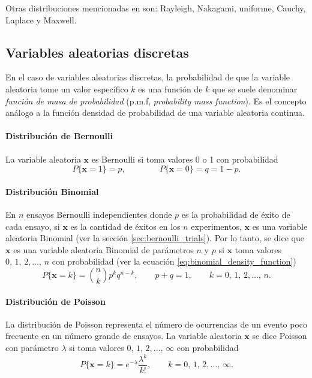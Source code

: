 \documentclass[a4paper]{report}
\newcommand{\x}{\mathbf{x}}
\begin{document}
Otras distribuciones mencionadas en \cite{papoulis2002probability} son: Rayleigh, Nakagami, uniforme, Cauchy, Laplace y Maxwell.

\subsection{Variables aleatorias discretas}\label{sec:discrete_random_variables}

En el caso de variables aleatorias discretas, la probabilidad de que la variable aleatoria tome un valor específico \(k\) es una función de \(k\) que se suele denominar \emph{función de masa de probabilidad} (p.m.f, \emph{probability mass function}). Es el concepto análogo a la función densidad de probabilidad de una variable aleatoria continua.

\paragraph{Distribución de Bernoulli} 

La variable aleatoria \(\x\) es Bernoulli si toma valores 0 o 1 con probabilidad
\[
 P\{\x=1\}=p,\qquad\qquad P\{\x=0\}=q=1-p.
\]

\paragraph{Distribución Binomial}

En \(n\) ensayos Bernoulli independientes donde \(p\) es la probabilidad de éxito de cada ensayo, si \(\x\) es la cantidad de éxitos en los \(n\) experimentos, \(\x\) es una variable aleatoria Binomial (ver la sección \ref{sec:bernoulli_trials}). Por lo tanto, se dice que \(\x\) es una variable aleatoria Binomial de parámetros \(n\) y \(p\) si \(\x\) toma valores \(0,\,1,\,2,\dots,\,n\) con probabilidad (ver la ecuación \ref{eq:binomial_density_function})
\begin{equation}\label{eq:binomial_density_function2}
 P\{\x=k\}=\binom{n}{k}p^{k}q^{n-k},\qquad p+q=1,\qquad k=0,\,1,\,2,\dots,\,n.
\end{equation}

\paragraph{Distribución de Poisson}

La distribución de Poisson representa el número de ocurrencias de un evento poco frecuente en un número grande de ensayos. La variable aleatoria \(\x\) se dice Poisson con parámetro \(\lambda\) si toma valores \(0,\,1,\,2,\dots,\,\infty\) con probabilidad
\begin{equation}\label{eq:pdf_poisson}
 P\{\x=k\}=e^{-\lambda}\frac{\lambda^k}{k!},\qquad k=0,\,1,\,2,\dots,\,\infty.
\end{equation}
\end{document}

